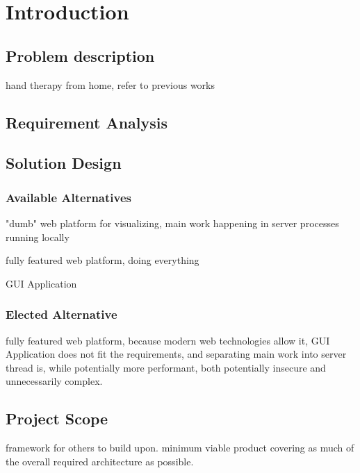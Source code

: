 \chapter{Introduction}
\section{Problem description}
hand therapy from home, refer to previous works
\section{Requirement Analysis}
\section{Solution Design}
\subsection{Available Alternatives}
"dumb" web platform for visualizing, main work happening in server processes running locally

fully featured web platform, doing everything

GUI Application
\subsection{Elected Alternative}
fully featured web platform, because modern web technologies allow it, GUI Application does not fit the requirements, and separating main work into server thread is, while potentially more performant, both potentially insecure and unnecessarily complex.
\section{Project Scope}
framework for others to build upon. minimum viable product covering as much of the overall required architecture as possible.